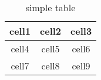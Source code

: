 \begin{table}
\centering
	\begin{tabular}{ c c c }
		\toprule
		cell1 & cell2 & cell3 \\ 
		\midrule
		cell4 & cell5 & cell6 \\  
		cell7 & cell8 & cell9 \\
		\bottomrule   
	\end{tabular}
	\caption{simple table}
\end{table}
